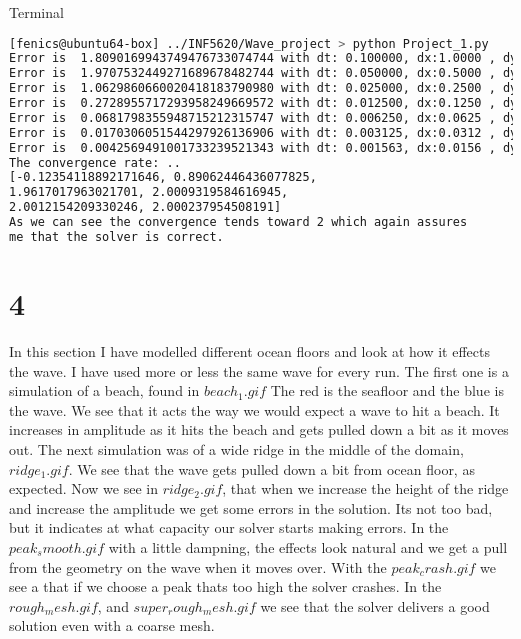 \documentclass[a4paper,norsk]{article}
\begin{document}
\noindent Terminal
\begin{lstlisting}[language=bash]
[fenics@ubuntu64-box] ../INF5620/Wave_project > python Project_1.py 
Error is  1.8090169943749476733074744 with dt: 0.100000, dx:1.0000 , dy:1.0000 
Error is  1.9707532449271689678482744 with dt: 0.050000, dx:0.5000 , dy:0.5000 
Error is  1.0629860660020418183790980 with dt: 0.025000, dx:0.2500 , dy:0.2500 
Error is  0.2728955717293958249669572 with dt: 0.012500, dx:0.1250 , dy:0.1250 
Error is  0.0681798355948715212315747 with dt: 0.006250, dx:0.0625 , dy:0.0625 
Error is  0.0170306051544297926136906 with dt: 0.003125, dx:0.0312 , dy:0.0312
Error is  0.0042569491001733239521343 with dt: 0.001563, dx:0.0156 , dy:0.0156 
The convergence rate: .. 
[-0.12354118892171646, 0.89062446436077825, 
1.9617017963021701, 2.0009319584616945, 
2.0012154209330246, 2.000237954508191]
As we can see the convergence tends toward 2 which again assures 
me that the solver is correct.

\end{lstlisting}



\section*{4}

In this section I have modelled different ocean floors and look at how it effects the wave. I have used more or less the same wave for every run.
The first one is a simulation of a beach, found in $beach_1.gif$  
The red is the seafloor and the blue is the wave. We see that it acts the way we would expect a wave to hit a beach. It increases in amplitude as it hits the beach and gets pulled down a bit as it moves out.
The next simulation was of a wide ridge in the middle of the domain,$ ridge_1.gif$. We see that the wave gets pulled down a bit from ocean floor, as expected. Now we see in $ridge_2.gif$, that when we increase the height of the ridge and increase the amplitude we get some errors in the solution. Its not too bad, but it indicates at what capacity our solver starts making errors.
In the $peak_smooth.gif$ with a little dampning, the effects look natural and we get a pull from the geometry on the wave when it moves over.
With the $peak_crash.gif$ we see a that if we choose a peak thats too high the solver crashes.
In the $rough_mesh.gif$, and $super_rough_mesh.gif$ we see that the solver delivers a good solution even with a coarse mesh.
\end{document}
